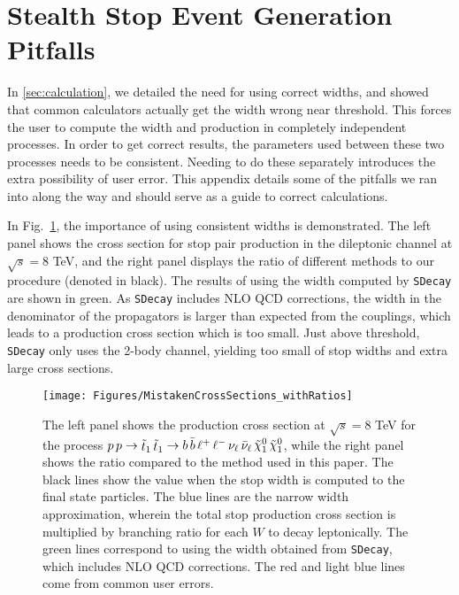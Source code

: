 \documentclass[a4paper,12pt]{article}
\def\stopone{\ensuremath{\mathchoice%
      {\displaystyle\raise.0ex\hbox{$\displaystyle\tilde t_1$}}%
         {\textstyle\raise-.2ex\hbox{$\textstyle\tilde t_1$}}%
       {\scriptstyle\raise.0ex\hbox{$\scriptstyle\tilde t_1$}}%
 {\scriptscriptstyle\raise.0ex\hbox{$\scriptscriptstyle\tilde t_1$}}}}
\def\ninoone{\ensuremath{\mathchoice%
      {\displaystyle\raise.4ex\hbox{$\displaystyle\tilde\chi^0_1$}}%
         {\textstyle\raise.1ex\hbox{$\textstyle\tilde\chi^0_1$}}%
       {\scriptstyle\raise.3ex\hbox{$\scriptstyle\tilde\chi^0_1$}}%
 {\scriptscriptstyle\raise.3ex\hbox{$\scriptscriptstyle\tilde\chi^0_1$}}}}
\begin{document}
\section{Stealth Stop Event Generation Pitfalls}
\label{sec:pitfalls}

In \cref{sec:calculation}, we detailed the need for using correct widths, and showed that common calculators actually get the width wrong near threshold. This forces the user to compute the width and production in completely independent processes. In order to get correct results, the parameters used between these two processes needs to be consistent. Needing to do these separately introduces the extra possibility of user error. This appendix details some of the pitfalls we ran into along the way and should serve as a guide to correct calculations.

In Fig.~\ref{fig:BadWidth}, the importance of using consistent widths is demonstrated. The left panel shows the cross section for stop pair production in the dileptonic channel at $\sqrt{s}=8$ TeV, and the right panel displays the ratio of different methods to our procedure (denoted in black). The results of using the width computed by \texttt{SDecay} are shown in green. As \texttt{SDecay} includes NLO QCD corrections, the width in the denominator of the propagators is larger than expected from the couplings, which leads to a production cross section which is too small. Just above threshold, \texttt{SDecay} only uses the 2-body channel, yielding too small of stop widths and extra large cross sections.

\begin{figure}[t]
\begin{center}
\texttt{[image: Figures/MistakenCrossSections\_withRatios]}
\caption{The left panel shows the production cross section at $\sqrt{s}=8$ TeV for the process $p\,p\rightarrow \stopone \,\stopone \rightarrow b \,\bar{b}\, \ell^+ \,\ell^-\, \nu_{\ell}\, \bar{\nu}_{\ell}\, \ninoone\,\ninoone$, while the right panel shows the ratio compared to the method used in this paper. The black lines show the value when the stop width is computed to the final state particles. The blue lines are the narrow width approximation, wherein the total stop production cross section is multiplied by branching ratio for each $W$ to decay leptonically. The green lines correspond to using the width obtained from \texttt{SDecay}, which includes NLO QCD corrections. The red and light blue lines come from common user errors.}
\label{fig:BadWidth}
\end{center}
\end{figure}
\end{document}
